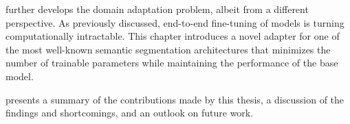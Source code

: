 further develops the domain adaptation problem, albeit from a different perspective. As previously discussed, end-to-end fine-tuning of models is turning computationally intractable. This chapter introduces a novel adapter for one of the most well-known semantic segmentation architectures that minimizes the number of trainable parameters while maintaining the performance of the base model. 

 presents a summary of the contributions made by this thesis, a discussion of the findings and shortcomings, and an outlook on future work.
